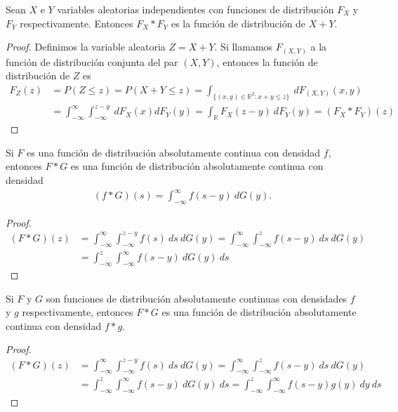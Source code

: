 \begin{teo}
    Sean $X$ e $Y$ variables aleatorias independientes con funciones de distribución $F_X$ y $F_Y$ respectivamente. Entonces $F_X*F_Y$ es la función de distribución de $X+Y$.
\end{teo}

\begin{proof}
    Definimos la variable aleatoria $Z = X+Y$. Si llamamos $F_{(X,Y)}$ a la función de distribución conjunta del par $(X,Y)$, entonces la función de distribución de $Z$ es
    \begin{align*}
        F_Z(z) & = P(Z \leq z) = P(X+Y \leq z) = \int_{\{(x,y) \in \mathbb{R}^2 : x+y\leq z \}} \ dF_{(X,Y)}(x,y)                      \\
               & = \int_{-\infty}^{\infty} \int_{-\infty}^{z-y} \ dF_X(x)dF_Y(y) = \int_{\mathbb{R}} F_X(z-y) \ dF_Y(y) = (F_X*F_Y)(z)
    \end{align*}
\end{proof}

\begin{teo}
    Si $F$ es una función de distribución absolutamente continua con densidad $f$, entonces $F*G$ es una función de distribución absolutamente continua con densidad
    \begin{align*}
        (f*G)(s) = \int_{-\infty}^{\infty} f(s-y) \ dG(y).
    \end{align*}
\end{teo}

\begin{proof}
    \begin{align*}
        (F*G)(z) & = \int_{-\infty}^{\infty} \int_{-\infty}^{z-y} f(s) \ ds \ dG(y) = \int_{-\infty}^{\infty} \int_{-\infty}^{z} f(s-y) \ ds \ dG(y) \\
                 & = \int_{-\infty}^{z} \int_{-\infty}^{\infty} f(s-y) \ dG(y) \ ds
    \end{align*}
\end{proof}

\begin{teo}
    Si $F$ y $G$ son funciones de distribución absolutamente continuas con densidades $f$ y $g$ respectivamente, entonces $F*G$ es una función de distribución absolutamente continua con densidad $f*g$.
\end{teo}

\begin{proof}
    \begin{align*}
        (F*G)(z) & = \int_{-\infty}^{\infty} \int_{-\infty}^{z-y} f(s) \ ds \ dG(y) = \int_{-\infty}^{\infty} \int_{-\infty}^{z} f(s-y) \ ds \ dG(y)   \\
                 & = \int_{-\infty}^{z} \int_{-\infty}^{\infty} f(s-y) \ dG(y) \ ds = \int_{-\infty}^{z} \int_{-\infty}^{\infty} f(s-y) g(y) \ dy \ ds
    \end{align*}
\end{proof}

